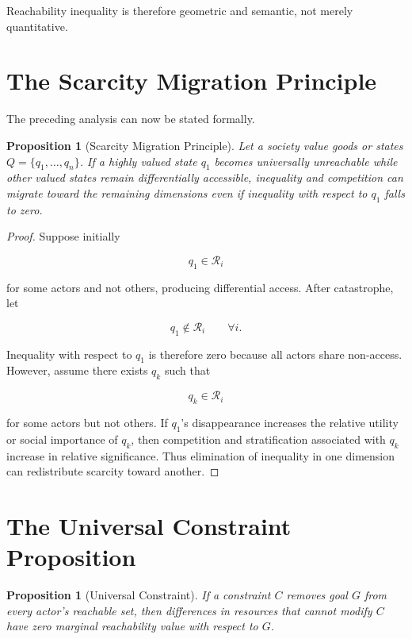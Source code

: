 \documentclass[11pt,oneside]{book}
\newtheorem{proposition}[theorem]{Proposition}
\theoremstyle{definition}
\theoremstyle{remark}
\newcommand{\R}{\mathcal{R}}
\begin{document}
Reachability inequality is therefore geometric and semantic, not merely quantitative.

\section{The Scarcity Migration Principle}

The preceding analysis can now be stated formally.

\begin{proposition}[Scarcity Migration Principle]
Let a society value goods or states \(Q=\{q_1,\ldots,q_n\}\). If a highly valued state \(q_1\) becomes universally unreachable while other valued states remain differentially accessible, inequality and competition can migrate toward the remaining dimensions even if inequality with respect to \(q_1\) falls to zero.
\end{proposition}

\begin{proof}
Suppose initially

\[
q_1\in\R_i
\]

for some actors and not others, producing differential access. After catastrophe, let

\[
q_1\notin\R_i
\qquad
\forall i.
\]

Inequality with respect to \(q_1\) is therefore zero because all actors share non-access. However, assume there exists \(q_k\) such that

\[
q_k\in\R_i
\]

for some actors but not others. If \(q_1\)'s disappearance increases the relative utility or social importance of \(q_k\), then competition and stratification associated with \(q_k\) increase in relative significance. Thus elimination of inequality in one dimension can redistribute scarcity toward another.
\end{proof}

\section{The Universal Constraint Proposition}

\begin{proposition}[Universal Constraint]
If a constraint \(C\) removes goal \(G\) from every actor's reachable set, then differences in resources that cannot modify \(C\) have zero marginal reachability value with respect to \(G\).
\end{proposition}
\end{document}
